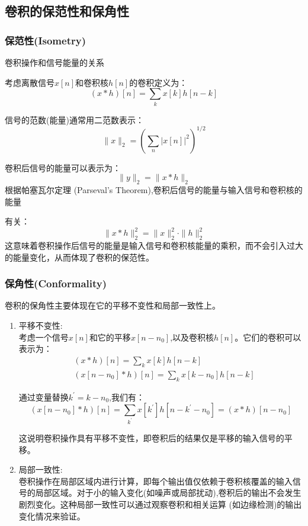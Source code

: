 \documentclass{lzureport}
\begin{document}
\subsection{卷积的保范性和保角性}
\subsubsection{保范性(Isometry)}
卷积操作和信号能量的关系

考虑离散信号$x[n]$和卷积核$h[n]$的卷积定义为：
$$(x*h)[n]=\sum_kx[k]h[n-k]$$

信号的范数(能量)通常用二范数表示：
$$\|x\|_2=\left(\sum_n|x[n]|^2\right)^{1/2}$$

卷积后信号的能量可以表示为：
$$\|y\|_2=\|x*h\|_2$$
根据帕塞瓦尔定理 (Parseval's Theorem),卷积后信号的能量与输入信号和卷积核的能量

有关：
$$\|x*h\|_2^2=\|x\|_2^2\cdot\|h\|_2^2$$
这意味着卷积操作后信号的能量是输入信号和卷积核能量的乘积，而不会引入过大的能量变化，从而体现了卷积的保范性。

\subsubsection{保角性(Conformality)}
卷积的保角性主要体现在它的平移不变性和局部一致性上。

\begin{enumerate}[label=\arabic*)]
	\item 平移不变性:\\

	考虑一个信号$x[n]$和它的平移$x[n-n_0]$,以及卷积核$h[n]$。它们的卷积可以表示为：
	$$\begin{aligned}&(x*h)[n]=\sum_kx[k]h[n-k]\\&(x[n-n_0]*h)[n]=\sum_kx[k-n_0]h[n-k]\end{aligned}$$
	
	通过变量替换$k^{\prime}=k-n_0$,我们有：
	$$(x[n-n_0]*h)[n]=\sum_{k^{\prime}}x[k^{\prime}]h[n-k^{\prime}-n_0]=(x*h)[n-n_0]$$
	
	这说明卷积操作具有平移不变性，即卷积后的结果仅是平移的输入信号的平移。

	\item 局部一致性:\\
	卷积操作在局部区域内进行计算，即每个输出值仅依赖于卷积核覆盖的输入信号的局部区域。对于小的输入变化(如噪声或局部扰动),卷积后的输出不会发生剧烈变化。这种局部一致性可以通过观察卷积和相关运算 (如边缘检测)的输出变化情况来验证。
\end{enumerate}
\end{document}
